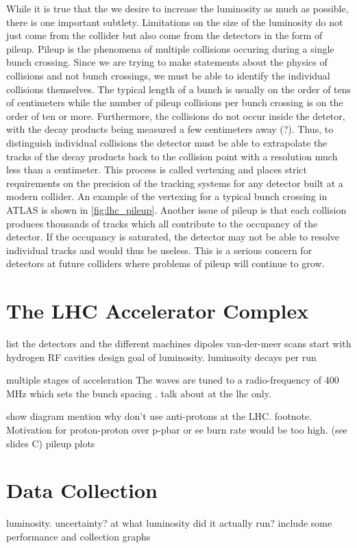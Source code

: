 While it is true that the we desire to increase the luminosity as much
as possible, there is one important subtlety. 
Limitations on the size of the luminosity do not just
come from the collider but also come from the detectors in the form of pileup.
Pileup is the phenomena of multiple collisions occuring during a single
bunch crossing. Since we are trying to make statements about the 
physics of collisions and not bunch crossings, we must be able to 
identify the individual collisions themselves. The typical length of 
a bunch is usually on the order of tens of centimeters while the number of pileup 
collisions per bunch crossing is on the order of ten or more. Furthermore, 
the collisions do not occur inside the detetor, with the decay products
being measured a few centimeters away (?). Thus, to distinguish individual
collisions the detector must be able to extrapolate the tracks of the decay
products back to the collision point with a resolution much less than 
a centimeter. This process is called vertexing and places strict 
requirements on the precision of the tracking systems for any detector
built at a modern collider. An example of the vertexing for a typical
bunch crossing in ATLAS is shown in \fig\ref{fig:lhc_pileup}.
Another issue of pileup is that each collision produces thousands of 
tracks which all contribute to the occupancy of the detector. If the occupancy
is saturated, the detector may not be able to resolve individual tracks
and would thus be useless. This is a serious concern for detectors
at future colliders where problems of pileup will continue to grow.


\section{The LHC Accelerator Complex}
list the detectors and the different machines
dipoles
van-der-meer scans
start with hydrogen
RF cavities
design goal of luminosity. luminsoity decays per run

multiple stages of acceleration
The waves are tuned to a radio-frequency of 400 MHz which sets the bunch spacing .  talk about at the lhc only.

show diagram
mention why don't use anti-protons at the LHC.
footnote. Motivation for proton-proton over p-pbar or ee burn rate would be too high. (see slides C)
pileup plots
\section{Data Collection}

luminosity. uncertainty?
at what luminosity did it actually run?
include some performance and collection graphs
